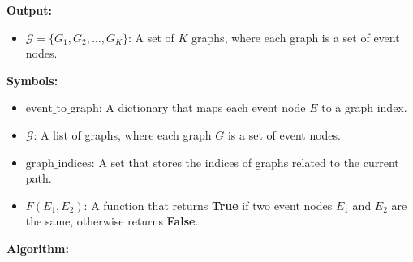 \textbf{Output:}
\begin{itemize}
    \item \( \mathcal{G} = \{G_1, G_2, \dots, G_K\} \): A set of \( K \) graphs, where each graph is a set of event nodes.
\end{itemize}

\textbf{Symbols:}
\begin{itemize}
    \item \( \text{event\_to\_graph} \): A dictionary that maps each event node \( E \) to a graph index.
    \item \( \mathcal{G} \): A list of graphs, where each graph \( G \) is a set of event nodes.
    \item \( \text{graph\_indices} \): A set that stores the indices of graphs related to the current path.
    \item \( F(E_1, E_2) \): A function that returns \textbf{True} if two event nodes \( E_1 \) and \( E_2 \) are the same, otherwise returns \textbf{False}.
\end{itemize}

\textbf{Algorithm:}

